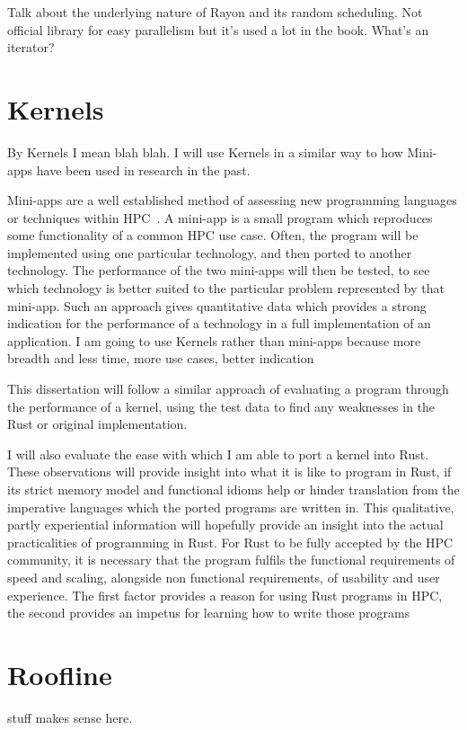 Talk about the underlying nature of Rayon and its random scheduling. Not official library for easy parallelism but it's used a lot in the book.
What's an iterator?
\section{Kernels}
By Kernels I mean blah blah. I will use Kernels in a similar way to how Mini-apps have been used in research in the past.

Mini-apps are a well established method of assessing new programming languages or techniques within HPC~\cite{Mallinson:2014, Slaughter:2015, martineau2017arch}. A mini-app is a small program which reproduces some functionality of a common HPC use case. Often, the program will be implemented using one particular technology, and then ported to another technology. The performance of the two mini-apps will then be tested, to see which technology is better suited to the particular problem represented by that mini-app. Such an approach gives quantitative data which provides a strong indication for the performance of a technology in a full implementation of an application. I am going to use Kernels rather than mini-apps because more breadth and less time, more use cases, better indication

This dissertation will follow a similar approach of evaluating a program through the performance of a kernel, using the test data to find any weaknesses in the Rust or original implementation.

I will also evaluate the ease with which I am able to port a kernel into Rust. These observations will provide insight into what it is like to program in Rust, if its strict memory model and functional idioms help or hinder translation from the imperative languages which the ported programs are written in. This qualitative, partly experiential information will hopefully provide an insight into the actual practicalities of programming in Rust. For Rust to be fully accepted by the HPC community, it is necessary that the program fulfils the functional requirements of speed and scaling, alongside non functional requirements, of usability and user experience. The first factor provides a reason for using Rust programs in HPC, the second provides an impetus for learning how to write those programs


\section{Roofline} stuff makes sense here.
